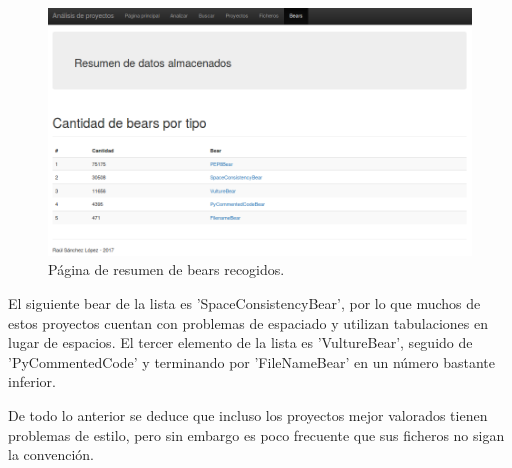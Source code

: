 \documentclass[a4paper, 12pt]{book}
\begin{document}
\begin{figure}[H]
  \centering
  \includegraphics[width=15cm, keepaspectratio]{img/resultadosBear}
  \caption{Página de resumen de bears recogidos.}
  \label{fig:resultadosBear}
\end{figure}

El siguiente bear de la lista es 'SpaceConsistencyBear', por lo que muchos de estos proyectos cuentan con problemas de espaciado y utilizan tabulaciones en lugar de espacios. El tercer elemento de la lista es 'VultureBear', seguido de 'PyCommentedCode' y terminando por 'FileNameBear' en un número bastante inferior.

De todo lo anterior se deduce que incluso los proyectos mejor valorados tienen problemas de estilo, pero sin embargo es poco frecuente que sus ficheros no sigan la convención.
\end{document}
